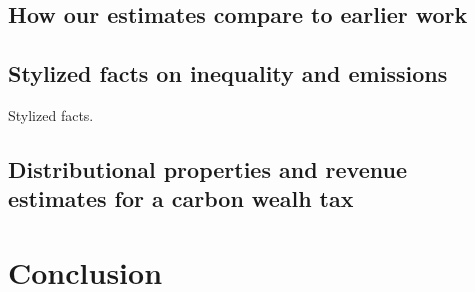 \documentclass[10pt]{beamer}
\begin{document}
\subsection{How our estimates compare to earlier work}
\begin{frame}{\subsecname}
\end{frame}

\subsection{Stylized facts on inequality and emissions}
\begin{frame}{\subsecname}
    Stylized facts.
\end{frame}

\subsection{Distributional properties and revenue estimates for a carbon wealh tax}
\begin{frame}{\subsecname}
\end{frame}

\section{Conclusion}
\begin{frame}
    \tableofcontents[currentsection, hideothersubsections, sections=\value{section}]
\end{frame}
\end{document}
